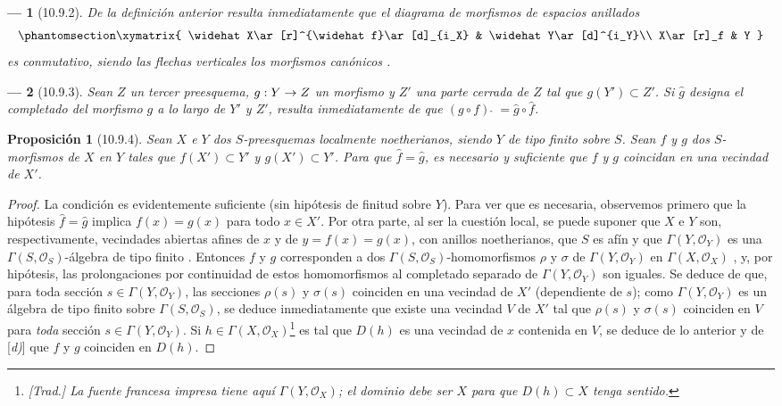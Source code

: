 \documentclass[oneside]{amsart}
\theoremstyle{ega-env-style}
\newtheorem*{env}{---}
\theoremstyle{ega-thm-env-style}
\newtheorem*{proposition}{Proposición}
\theoremstyle{ega-defn-env-style}
\def\mathcal{\mathscr}
\def\sh{\mathcal}                   %
\renewcommand{\to}{\mathchoice{\longrightarrow}{\rightarrow}{\rightarrow}{\rightarrow}}
\let\EGAOriginalLabel\label
\renewcommand{\label}[1]{\phantomsection\EGAOriginalLabel{#1}}
\begin{document}
\begin{env}[10.9.2]
\label{I.10.9.2}
De la definición anterior resulta inmediatamente que el diagrama de morfismos de espacios anillados
\[
  \label{I.10.9.2.1-fr}
  \xymatrix{
    \widehat X\ar[r]^{\widehat f}\ar[d]_{i_X} &
    \widehat Y\ar[d]^{i_Y}\\
    X\ar[r]_f &
    Y
  }
\]
es conmutativo, siendo las flechas verticales los morfismos canónicos .
\end{env}

\begin{env}[10.9.3]
\label{I.10.9.3}
Sean $Z$ un tercer preesquema, $g:Y\to Z$ un morfismo y $Z'$ una parte cerrada de $Z$ tal que $g(Y')\subset Z'$.
Si $\widehat g$ designa el completado del morfismo $g$ a lo largo de $Y'$ y $Z'$, resulta inmediatamente de  que
$(g\circ f){\,\widehat{\,}\,}=\widehat g\circ\widehat f$.
\end{env}

\begin{proposition}[10.9.4]
\label{I.10.9.4}
Sean $X$ e $Y$ dos $S$-preesquemas localmente noetherianos, siendo $Y$ de tipo finito sobre $S$.
Sean $f$ y $g$ dos $S$-morfismos de $X$ en $Y$ tales que $f(X')\subset Y'$ y $g(X')\subset Y'$.
Para que $\widehat f=\widehat g$, es necesario y suficiente que $f$ y $g$ coincidan en una vecindad de $X'$.
\end{proposition}

\begin{proof}
La condición es evidentemente suficiente (sin hipótesis de finitud sobre $Y$).
Para ver que es necesaria, observemos primero que la hipótesis $\widehat f=\widehat g$ implica $f(x)=g(x)$ para todo $x\in X'$.
Por otra parte, al ser la cuestión local, se puede suponer que $X$ e $Y$ son, respectivamente, vecindades abiertas afines de $x$ y de $y=f(x)=g(x)$, con anillos noetherianos, que $S$ es afín y que $\Gamma(Y,\mathscr{O}_Y)$ es una $\Gamma(S,\mathscr{O}_S)$-álgebra de tipo finito .
Entonces $f$ y $g$ corresponden a dos $\Gamma(S,\mathscr{O}_S)$-homomorfismos $\rho$ y $\sigma$ de $\Gamma(Y,\mathscr{O}_Y)$ en $\Gamma(X,\mathscr{O}_X)$ , y, por hipótesis, las prolongaciones por continuidad de estos homomorfismos al completado separado de $\Gamma(Y,\mathscr{O}_Y)$ son iguales.
Se deduce de  que, para toda sección $s\in\Gamma(Y,\mathscr{O}_Y)$, las secciones $\rho(s)$ y $\sigma(s)$ coinciden en una vecindad de $X'$ (dependiente de $s$); como $\Gamma(Y,\mathscr{O}_Y)$ es un álgebra de tipo finito sobre $\Gamma(S,\mathscr{O}_S)$, se deduce inmediatamente que existe una vecindad $V$ de $X'$ tal que $\rho(s)$ y $\sigma(s)$ coinciden en $V$ para \emph{toda} sección $s\in\Gamma(Y,\mathscr{O}_Y)$.
Si $h\in\Gamma(X,\mathscr{O}_X)$\footnote{\emph{[Trad.] La fuente francesa impresa tiene aquí $\Gamma(Y,\sh{O}_X)$; el dominio debe ser $X$ para que $D(h)\subset X$ tenga sentido.}} es tal que $D(h)$ es una vecindad de $x$ contenida en $V$, se deduce de lo anterior y de [\emph{d)}] que $f$ y $g$ coinciden en $D(h)$.
\end{proof}
\end{document}
